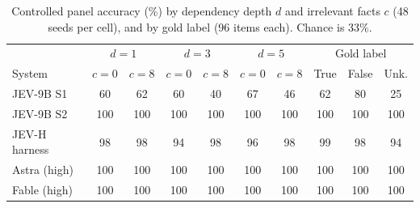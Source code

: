\begin{table}[t]
\centering\small
\caption{Controlled panel accuracy (\%) by dependency depth $d$ and irrelevant facts $c$ (48 seeds per cell), and by gold label (96 items each). Chance is 33\%.}
\label{tab:cells}
\begin{tabular}{@{}lcccccc|ccc@{}}
\toprule
& \multicolumn{2}{c}{$d=1$} & \multicolumn{2}{c}{$d=3$} & \multicolumn{2}{c|}{$d=5$} & \multicolumn{3}{c}{Gold label} \\
System & $c{=}0$ & $c{=}8$ & $c{=}0$ & $c{=}8$ & $c{=}0$ & $c{=}8$ & True & False & Unk. \\
\midrule
JEV-9B S1 & 60 & 62 & 60 & 40 & 67 & 46 & 62 & 80 & 25 \\
JEV-9B S2 & 100 & 100 & 100 & 100 & 100 & 100 & 100 & 100 & 100 \\
JEV-H harness & 98 & 98 & 94 & 98 & 96 & 98 & 99 & 98 & 94 \\
Astra (high) & 100 & 100 & 100 & 100 & 100 & 100 & 100 & 100 & 100 \\
Fable (high) & 100 & 100 & 100 & 100 & 100 & 100 & 100 & 100 & 100 \\
\bottomrule
\end{tabular}
\end{table}
